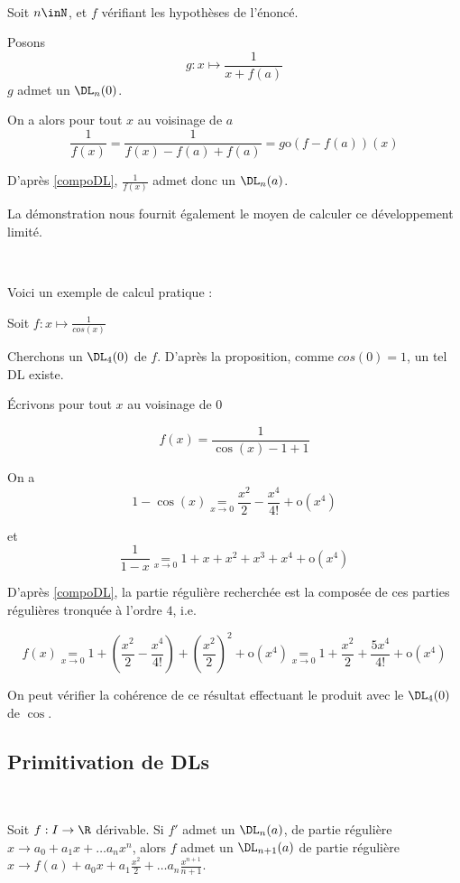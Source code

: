 \documentclass[12pt]{article}
\begin{document}
\begin{demo}~

Soit $n\inN$, et $f$ vérifiant les hypothèses de l'énoncé.

Posons $$g:x\mapsto \frac{1}{x+f(a)}$$ $g$ admet un $\DL_n(0)$.

On a alors pour tout $x$ au voisinage de $a$
$$\frac{1}{f(x)}=\frac{1}{f(x)-f(a)+f(a)} = g\text{o}(f-f(a))(x)$$ 

D'après \ref{compoDL}, $\frac{1}{f(x)}$ admet donc un $\DL_n(a)$.

\end{demo}

La démonstration nous fournit également le moyen de calculer ce
développement limité.

\begin{Exem}~

Voici un exemple de calcul pratique :

Soit $f:x\mapsto \frac{1}{cos(x)}$

Cherchons un $\DL_4(0)$ de $f$. D'après la proposition, comme $cos(0)=1$,
un tel DL existe.

Écrivons pour tout $x$ au voisinage de 0 

$$f(x)=\frac{1}{\cos(x)-1+1}$$

On a $$1-\cos(x)\underset{x\rightarrow
  0}{=}\frac{x^2}{2}-\frac{x^4}{4!}+\text{o}(x^4)$$

et $$\frac{1}{1-x}\underset{x\rightarrow
  0}{=}1+x+x^2+x^3+x^4+\text{o}(x^4)$$

D'après \ref{compoDL}, la partie régulière recherchée est la composée de
ces parties régulières tronquée à l'ordre $4$, i.e.

$$f(x)\underset{x\rightarrow
  0}{=}1+\left(\frac{x^2}{2}-\frac{x^4}{4!}\right)+\left(\frac{x^2}{2}\right)^2+\text{o}(x^4)\underset{x\rightarrow
  0}{=}1+\frac{x^2}{2}+\frac{5x^4}{4!}+\text{o}(x^4)$$ 


On peut vérifier la cohérence de ce résultat effectuant le produit avec le
$\DL_4(0)$ de $\cos$.

\end{Exem}



\subsection{Primitivation de DLs}

\begin{Prop}~

\label{primiDL}
  Soit $f:I\rightarrow \R$ dérivable. Si $f'$ admet un $\DL_n(a)$, de partie
  régulière $x\rightarrow a_0+a_1x+\dots a_nx^n$, alors $f$ admet un $\DL_{n+1}(a)$ de partie régulière $x\rightarrow f(a)+a_0x+a_1\frac{x^2}{2}+\dots a_n\frac{x^{n+1}}{n+1}$.

  
\end{Prop}
\end{document}
